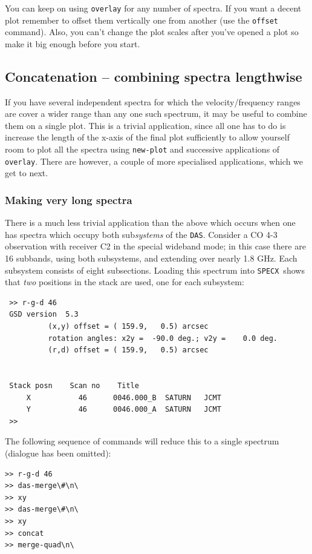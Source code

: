\documentclass[11pt,twoside]{article}
\newcommand{\SPECX}{{\tt SPECX}}
\newcommand{\das}{{\tt DAS}}
\begin{document}
You can keep on using {\tt overlay} for any number of spectra. If you
want a decent plot remember to offset them vertically one from another
(use the {\tt offset} command). Also, you can't change the plot scales
after you've opened a plot so make it big enough before you start.

\subsection{Concatenation -- combining spectra lengthwise}
If you have several independent spectra for which the
velocity/frequency ranges are cover a wider range than any one such
spectrum, it may be useful to combine them on a single plot. This is a
trivial application, since all one has to do is increase the length of
the x-axis of the final plot sufficiently to allow yourself room to
plot all the spectra using {\tt new-plot} and successive applications
of {\tt overlay}. There are however, a couple of more specialised
applications, which we get to next.

\subsubsection{Making very long spectra}
\label{sec:long-spectra}
There is a much less trivial application than the above which occurs
when one has spectra which occupy both sub{\it systems} of the \das .
Consider a CO 4-3 observation with receiver C2 in the
special wideband mode; in this case there are 16 subbands, using both
subsystems, and extending over nearly 1.8 GHz. Each subsystem consists
of eight subsections.  Loading this spectrum into \SPECX\ shows that
{\it two} positions in the stack are used, one for each subsystem:

\begin{verbatim}
 >> r-g-d 46
 GSD version  5.3
          (x,y) offset = ( 159.9,   0.5) arcsec
          rotation angles: x2y =  -90.0 deg.; v2y =    0.0 deg.
          (r,d) offset = ( 159.9,   0.5) arcsec


 Stack posn    Scan no    Title
     X           46      0046.000_B  SATURN   JCMT
     Y           46      0046.000_A  SATURN   JCMT
 >>
\end{verbatim}

The following sequence of commands will reduce this to a single
spectrum (dialogue has been omitted):

\begin{verbatim}
>> r-g-d 46
>> das-merge\#\n\
>> xy
>> das-merge\#\n\
>> xy
>> concat
>> merge-quad\n\
\end{verbatim}
\end{document}
